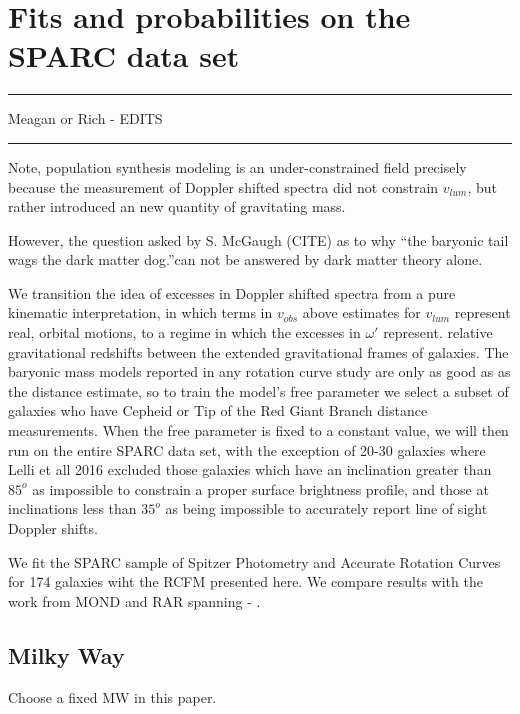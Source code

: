 \documentclass[reprint,%
 amsmath,amssymb,
 aps,
]{revtex4-1}
\begin{document}
%


  
\section{Fits and probabilities on  the SPARC data set  }
 {\color{red} \rule{\linewidth}{0.5mm}}
 
 {\color{red}Meagan or Rich - EDITS}
 {\color{red} \rule{\linewidth}{0.5mm}}
 
  Note,  population synthesis modeling  is an under-constrained field  precisely because the measurement of Doppler shifted spectra did not constrain $v_{lum}$, but rather introduced    an   new quantity of gravitating mass. 
 
    
However, the question  asked by S. McGaugh (CITE) as to why  ``the   baryonic tail wags the dark matter dog.''can not be answered by dark matter theory alone. 



We transition the idea of excesses in Doppler shifted spectra from a  pure kinematic interpretation, in which terms in  $v_{obs}$ above estimates for  $v_{lum}$ represent real, orbital motions, to a regime in which the excesses in $\omega'$ represent.
  relative gravitational redshifts between the extended gravitational  frames of  galaxies. 
 The baryonic mass models reported in any rotation curve study are only as good as    as the distance estimate, so to train the model's free parameter we select a subset of galaxies who have Cepheid or Tip of the Red Giant Branch distance measurements.  When the free parameter is fixed to a constant value, we will then run on the entire SPARC data set, with the exception of 20-30 galaxies where Lelli et all 2016 excluded those galaxies which have an inclination greater than $85^o$ as impossible to constrain a proper surface brightness profile, and those at inclinations less than $35^o$ as being impossible to accurately report line of sight Doppler shifts.   
 
 We fit the SPARC sample of Spitzer Photometry and Accurate Rotation Curves for 174 galaxies  \cite{2016Lelli} wiht the RCFM presented here. 
We compare results with the work from MOND and RAR spanning  \citet{McGaugh_2014}- \citet{Li_2018}. 
  
 
\subsection{Milky Way}
{\color{red}Choose a fixed MW in this paper. }
\end{document}
